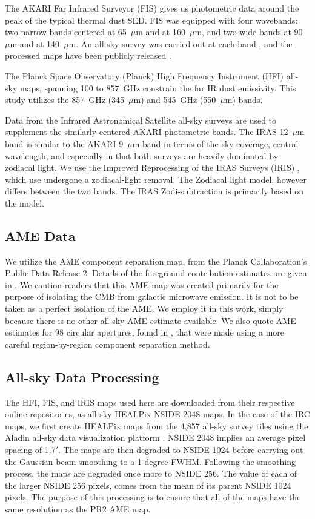 \documentclass[preprint2,longabstract]{aastex}
\begin{document}
    The AKARI Far Infrared Surveyor (FIS) gives us photometric data around the peak of the typical thermal dust SED. FIS was equipped with four wavebands: two narrow bands centered at 65~$\mu$m and at 160~$\mu$m, and two wide bands at 90~$\mu$m and at 140~$\mu$m. An all-sky survey was carried out at each band \citep{kawada07}, and the processed maps have been publicly released \citep{doi15}. 
    
     The Planck Space Observatory (Planck) High Frequency Instrument (HFI) all-sky maps, spanning 100 to 857~GHz \citep{hfi14viii} constrain the far IR dust emissivity. This study utilizes the 857~GHz (345~$\mu$m) and 545~GHz (550~$\mu$m) bands. 
     
     Data from the Infrared Astronomical Satellite \citep{iras84} all-sky surveys are used to supplement the similarly-centered AKARI photometric bands. The IRAS 12~$\mu$m band is similar to the AKARI 9~$\mu$m band in terms of the sky coverage, central wavelength, and especially in that both surveys are heavily dominated by zodiacal light. We use the Improved Reprocessing of the IRAS Surveys (IRIS) \citep{iris05}, which use undergone a zodiacal-light removal. The Zodiacal light model, however differs between the two bands. The IRAS Zodi-subtraction is primarily based on the \cite{kelsall98} model. 
     
\subsection{AME Data}
     We utilize the AME component separation map, from the Planck Collaboration's Public Data Release 2. Details of the foreground contribution estimates are given in \cite{planckXII}. We caution readers that this AME map was created primarily for the purpose of isolating the CMB from galactic microwave emission. It is not to be taken as a perfect isolation of the AME. We employ it in this work, simply because there is no other all-sky AME estimate available. We also quote AME estimates for 98 circular apertures, found in \cite{planckXV}, that were made using a more careful region-by-region component separation method.
 
\subsection{All-sky Data Processing}
 
      The HFI, FIS, and IRIS maps used here are downloaded from their respective online repositories, as all-sky HEALPix \citep{gorski15} NSIDE 2048 maps. In the case of the IRC maps, we first create HEALPix maps from the 4,857 all-sky survey tiles using the Aladin all-sky data visualization platform \citep{bonnarel00}. NSIDE 2048 implies an average pixel spacing of 1.7$'$. The maps are then degraded to NSIDE 1024 before carrying out the Gaussian-beam smoothing to a 1-degree FWHM. Following the smoothing process, the maps are degraded once more to NSIDE 256. The value of each of the larger NSIDE 256 pixels, comes from the mean of its parent NSIDE 1024 pixels. The purpose of this processing is to ensure that all of the maps have the same resolution as the PR2 AME map.
            
\end{document}
